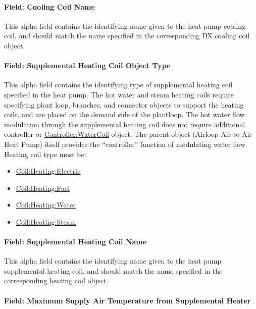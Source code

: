 \paragraph{Field: Cooling Coil Name}\label{field-cooling-coil-name-3}

This alpha field contains the identifying name given to the heat pump cooling coil, and should match the name specified in the corresponding DX cooling coil object.

\paragraph{Field: Supplemental Heating Coil Object Type}\label{field-supplemental-heating-coil-object-type-1}

This alpha field contains the identifying type of supplemental heating coil specified in the heat pump. The hot water and steam heating coils require specifying plant loop, branches, and connector objects to support the heating coils, and are placed on the demand side of the plantloop. The hot water flow modulation through the supplemental heating coil does not require additional controller or \hyperref[controllerwatercoil]{Controller:WaterCoil} object. The parent object (Airloop Air to Air Heat Pump) itself provides the ``controller'' function of modulating water flow. Heating coil type must be:

\begin{itemize}
\item
  \hyperref[coilheatingelectric]{Coil:Heating:Electric}
\item
  \hyperref[coilheatinggas-000]{Coil:Heating:Fuel}
\item
  \hyperref[coilheatingwater]{Coil:Heating:Water}
\item
  \hyperref[coilheatingsteam]{Coil:Heating:Steam}
\end{itemize}

\paragraph{Field: Supplemental Heating Coil Name}\label{field-supplemental-heating-coil-name-1}

This alpha field contains the identifying name given to the heat pump supplemental heating coil, and should match the name specified in the corresponding heating coil object.

\paragraph{Field: Maximum Supply Air Temperature from Supplemental Heater}\label{field-maximum-supply-air-temperature-from-supplemental-heater}

